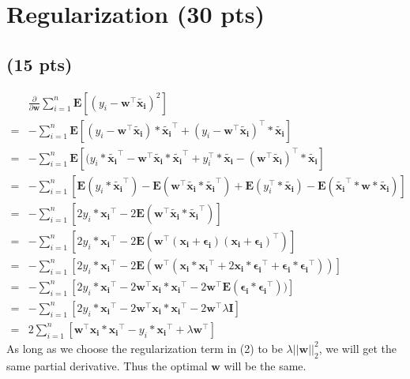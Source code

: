 \documentclass{article}
\begin{document}
\section{Regularization (30 pts)}
\subsection{(15 pts)} 
\begin{align*}
&\frac{\partial}{\partial \mathbf{w}}\sum_{i=1}^n \mathbf{E}[(y_i - \mathbf{w}^{\top}\tilde{\mathbf{x_i}})^2]\\
=& -\sum_{i=1}^n \mathbf{E}[(y_i - \mathbf{w}^{\top}\tilde{\mathbf{x_i}})*\tilde{\mathbf{x_i}}^\top +(y_i - \mathbf{w}^{\top}\tilde{\mathbf{x_i}})^\top*\tilde{\mathbf{x_i}}]\\
=&-\sum_{i=1}^n \mathbf{E}[(y_i*\tilde{\mathbf{x_i}}^\top  - \mathbf{w}^{\top}\tilde{\mathbf{x_i}}*\tilde{\mathbf{x_i}}^\top +y_i^\top*\tilde{\mathbf{x_i}} - (\mathbf{w}^{\top}\tilde{\mathbf{x_i}})^\top*\tilde{\mathbf{x_i}}]\\
=&-\sum_{i=1}^n [\mathbf{E}(y_i*\tilde{\mathbf{x_i}}^\top)  - \mathbf{E}(\mathbf{w}^{\top}\tilde{\mathbf{x_i}}*\tilde{\mathbf{x_i}}^\top) +\mathbf{E}(y_i^\top*\tilde{\mathbf{x_i}}) - \mathbf{E}(\tilde{\mathbf{x_i}}^\top*\mathbf{w}*\tilde{\mathbf{x_i}})]\\
=&-\sum_{i=1}^n [2y_i*\mathbf{x_i}^\top  - 2\mathbf{E}(\mathbf{w}^{\top}\tilde{\mathbf{x_i}}*\tilde{\mathbf{x_i}}^\top)]\\
=&-\sum_{i=1}^n [2y_i*\mathbf{x_i}^\top  - 2\mathbf{E}(\mathbf{w}^{\top}(\mathbf{x_i}+\mathbf{\epsilon_i})(\mathbf{x_i}+\mathbf{\epsilon_i})^\top)]\\
=&-\sum_{i=1}^n [2y_i*\mathbf{x_i}^\top  - 2\mathbf{E}(\mathbf{w}^{\top}(\mathbf{x_i}*\mathbf{x_i}^\top+2\mathbf{x_i}*\mathbf{\epsilon_i}^\top + \mathbf{\epsilon_i}*\mathbf{\epsilon_i}^\top))]\\
=&-\sum_{i=1}^n [2y_i*\mathbf{x_i}^\top  - 2\mathbf{w}^{\top}\mathbf{x_i}*\mathbf{x_i}^\top -2 \mathbf{w}^{\top}\mathbf{E}(\mathbf{\epsilon_i}*\mathbf{\epsilon_i}^\top))]\\
=&-\sum_{i=1}^n [2y_i*\mathbf{x_i}^\top  - 2\mathbf{w}^{\top}\mathbf{x_i}*\mathbf{x_i}^\top -2 \mathbf{w}^{\top}\lambda\mathbf{I}]\\
=&2\sum_{i=1}^n [ \mathbf{w}^{\top}\mathbf{x_i}*\mathbf{x_i}^\top -y_i*\mathbf{x_i}^\top +\lambda\mathbf{w}^{\top}]
\end{align*}
As long as we choose the regularization term in (2) to be $\lambda ||\mathbf{w}||_{2}^2$, we will get the same partial derivative. Thus the optimal $\mathbf{w}$ will be the same.
\end{document}
